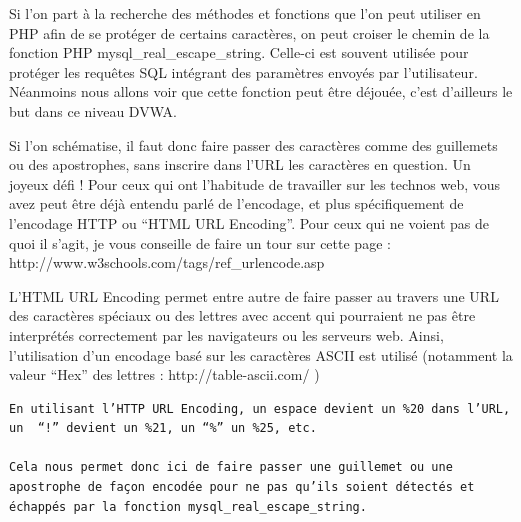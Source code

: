 

Si l’on part à la recherche des méthodes et fonctions que l’on peut utiliser en PHP afin de se protéger de certains caractères, on peut croiser le chemin de la fonction PHP mysql\_real\_escape\_string. Celle-ci est souvent utilisée pour protéger les requêtes SQL intégrant des paramètres envoyés par l’utilisateur. Néanmoins nous allons voir que cette fonction peut être déjouée, c’est d’ailleurs le but dans ce niveau DVWA.

Si l’on schématise, il faut donc faire passer des caractères comme des guillemets ou des apostrophes, sans inscrire dans l’URL les caractères en question. Un joyeux défi ! Pour ceux qui ont l’habitude de travailler sur les technos web, vous avez peut être déjà entendu parlé de l’encodage, et plus spécifiquement de l’encodage HTTP ou “HTML URL Encoding”. Pour ceux qui ne voient pas de quoi il s’agit, je vous conseille de faire un tour sur cette page : http://www.w3schools.com/tags/ref\_urlencode.asp

L’HTML URL Encoding permet entre autre de faire passer au travers une URL des caractères spéciaux ou des lettres avec accent qui pourraient ne pas être interprétés correctement par les navigateurs ou les serveurs web. Ainsi, l’utilisation d’un encodage basé sur les caractères ASCII est utilisé (notamment la valeur “Hex” des lettres : http://table-ascii.com/ )

\begin{verbatim}
En utilisant l’HTTP URL Encoding, un espace devient un %20 dans l’URL, un  “!” devient un %21, un “%” un %25, etc.

Cela nous permet donc ici de faire passer une guillemet ou une apostrophe de façon encodée pour ne pas qu’ils soient détectés et échappés par la fonction mysql_real_escape_string.
\end{verbatim}




%





